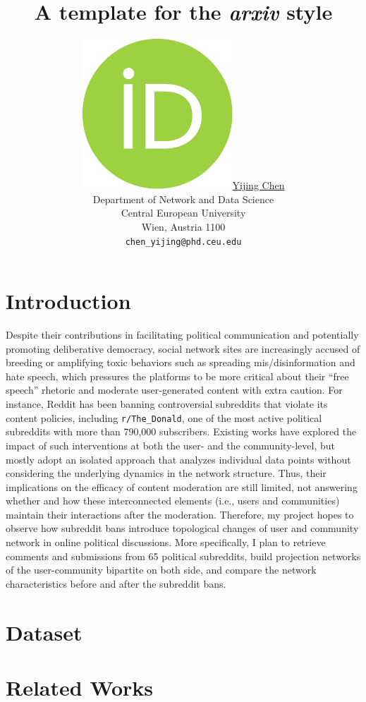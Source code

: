 \documentclass{article}
\title{A template for the \emph{arxiv} style}
\author{ \href{https://orcid.org/0000-0002-9311-6357}{\includegraphics[scale=0.06]{orcid.pdf}\hspace{1mm}Yijing Chen}\\
	Department of Network and Data Science\\
	Central European University\\
	Wien, Austria 1100 \\
	\texttt{chen\_yijing@phd.ceu.edu} \\
}
\begin{document}
\maketitle

\begin{abstract}
	\lipsum[1]
\end{abstract}




\section{Introduction}

Despite their contributions in facilitating political communication and potentially promoting deliberative democracy, social network sites are increasingly accused of breeding or amplifying toxic behaviors such as spreading mis/disinformation and hate speech, which pressures the platforms to be more critical about their ``free speech'' rhetoric and moderate user-generated content with extra caution. For instance, Reddit has been banning controversial subreddits that violate its content policies, including {\tt r/The\_Donald}, one of the most active political subreddits with more than 790,000 subscribers. Existing works have explored the impact of such interventions at both the user- and the community-level\cite{copland2020reddit, chandrasekharan2017you}, but mostly adopt an isolated approach that analyzes individual data points without considering the underlying dynamics in the network structure. Thus, their implications on the efficacy of content moderation are still limited, not answering whether and how these interconnected elements (i.e., users and communities) maintain their interactions after the moderation. Therefore, my project hopes to observe how subreddit bans introduce topological changes of user and community network in online political discussions. More specifically, I plan to retrieve comments and submissions from 65 political subreddits\cite{rajadesingan2020quick}, build projection networks of the user-community bipartite on both side, and compare the network characteristics before and after the subreddit bans.


\section{Dataset}

\section{Related Works}
\end{document}
